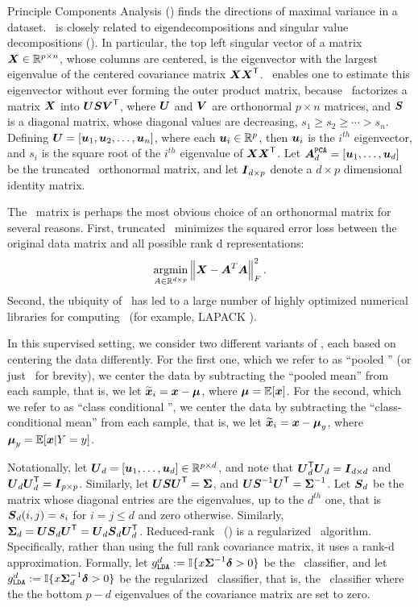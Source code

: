 \documentclass[11pt]{extarticle}
\begin{document}
Principle Components Analysis (\Pca) finds the directions of maximal variance in a dataset.  \Pca~is closely related to eigendecompositions and singular value decompositions (\Svd).  In particular, the top left singular vector of a matrix $\boldsymbol{X} \in \mathbb{R}^{p \times n}$, whose columns are centered, is the eigenvector with the largest eigenvalue of the centered covariance matrix $\boldsymbol{X} \boldsymbol{X}^{\mathsf{T}}$.  \Svd~enables one to estimate this eigenvector without ever forming the outer product matrix, because \Svd~factorizes a matrix $\boldsymbol{X}$ into $\boldsymbol{U} \boldsymbol{S} \boldsymbol{V}^{\mathsf{T}}$, where  $\boldsymbol{U}$ and $\boldsymbol{V}$ are orthonormal  ${p \times n}$ matrices, and $\boldsymbol{S}$ is a diagonal matrix, whose diagonal values are decreasing,
$s_1 \geq s_2 \geq \cdots > s_n$.  Defining $\boldsymbol{U} =[\boldsymbol{u}_1, \boldsymbol{u}_2, \ldots, \boldsymbol{u}_n]$, where each $\boldsymbol{u}_i \in \mathbb{R}^p$, then $\boldsymbol{u}_i$ is the $i^{th}$ eigenvector, and $s_i$ is the square root of the $i^{th}$ eigenvalue of $\boldsymbol{X} \boldsymbol{X}^{\mathsf{T}}$.
Let $\boldsymbol{A}^{{\texttt{PCA}}}_d =[\boldsymbol{u}_1, \ldots , \boldsymbol{u}_d]$ be the truncated \Pca~orthonormal matrix, and let $\boldsymbol{I}_{d \times p}$ denote a $d \times p$ dimensional identity matrix.

The \Pca~matrix is perhaps the most obvious choice of an orthonormal matrix for several reasons.  First, truncated \Pca~minimizes the squared error loss between the original data matrix and all possible rank d representations:
\begin{align*}
\argmin_{A \in \Real^{d \times p}} \norm{ \bX - \bA^T \bA }_F^2.
\end{align*}
Second, the ubiquity of \Pca~has led to a large number of highly optimized numerical libraries for computing \Pca~(for example, LAPACK \cite{Anderson1999a}).

In this supervised setting, we consider two different variants of \Pca, each based on centering the data differently.  For the first one, which we refer to as ``pooled \Pca'' (or just \Pca~for brevity), we center the data by subtracting the ``pooled mean'' from each sample, that is, we let $\widetilde{\boldsymbol{x}}_i=\boldsymbol{x}-\boldsymbol{\mu}$, where $\boldsymbol{\mu}=\mathbb{E}[\boldsymbol{x}]$.
For the second, which we refer to as ``class conditional \Pca'', we center the data by subtracting the ``class-conditional mean'' from each sample, that is, we let $\widetilde{\boldsymbol{x}}_i = \boldsymbol{x} - \boldsymbol{\mu}_y$, where $\boldsymbol{\mu}_y=\mathbb{E}[\boldsymbol{x} | Y=y]$.


Notationally, let $\boldsymbol{U}_d=[\boldsymbol{u}_1,\ldots,\boldsymbol{u}_d] \in \mathbb{R}^{p \times d}$, and note that $\boldsymbol{U}_d^{\mathsf{T}} \boldsymbol{U}_d = \boldsymbol{I}_{d \times d}$ and $\boldsymbol{U}_d \boldsymbol{U}_d^{\mathsf{T}}  = \boldsymbol{I}_{p \times p}$.
Similarly, let $\boldsymbol{U} \boldsymbol{S} \boldsymbol{U}^{\mathsf{T}} = \boldsymbol{\Sigma}$,
and $\boldsymbol{U} \boldsymbol{S}^{-1} \boldsymbol{U}^{\mathsf{T}} = \boldsymbol{\Sigma}^{-1}$.  Let $\boldsymbol{S}_d$ be the matrix whose diagonal entries are the eigenvalues, up to the $d^{th}$ one, that is $\boldsymbol{S}_d(i,j)=s_i$ for $i=j \leq d$ and zero otherwise.  Similarly, $\boldsymbol{\Sigma}_d=\boldsymbol{U} \boldsymbol{S}_d \boldsymbol{U}^{\mathsf{T}}=\boldsymbol{U}_d \boldsymbol{S}_d \boldsymbol{U}_d^{\mathsf{T}}$.
%
Reduced-rank \Lda~(\Rrlda) is a regularized \Lda~algorithm.  Specifically, rather than using the full rank covariance matrix, it uses a rank-d approximation.  Formally,
let $g_{{\texttt{LDA}}}^d := \mathbb{I} \{ x \boldsymbol{\Sigma}^{-1} \boldsymbol{\delta} > 0\}$ be the  \Lda~classifier,
and let $g_{{\texttt{LDA}}}^d := \mathbb{I} \{ x \boldsymbol{\Sigma}_d^{-1} \boldsymbol{\delta} > 0\}$ be the regularized \Lda~classifier, that is, the \Lda~classifier where the the bottom $p-d$ eigenvalues of the covariance matrix are set to zero.
\end{document}
